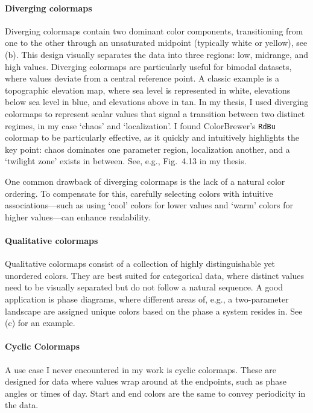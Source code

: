 \paragraph{Diverging colormaps}
Diverging colormaps contain two dominant color components, transitioning from one to the other through an unsaturated midpoint (typically white or yellow), see (b). This design visually separates the data into three regions: low, midrange, and high values. Diverging colormaps are particularly useful for bimodal datasets, where values deviate from a central reference point. A classic example is a topographic elevation map, where sea level is represented in white, elevations below sea level in blue, and elevations above in tan.
In my thesis, I used diverging colormaps to represent scalar values that signal a transition between two distinct regimes, in my case `chaos' and `localization'. I found ColorBrewer’s \texttt{RdBu} colormap to be particularly effective, as it quickly and intuitively highlights the key point: chaos dominates one parameter region, localization another, and a `twilight zone' exists in between. See, e.g., Fig.~4.13 in my thesis.

One common drawback of diverging colormaps is the lack of a natural color ordering. To compensate for this, carefully selecting colors with intuitive associations---such as using `cool' colors for lower values and `warm' colors for higher values---can enhance readability.

\paragraph{Qualitative colormaps}
Qualitative colormaps consist of a collection of highly distinguishable yet unordered colors. They are best suited for categorical data, where distinct values need to be visually separated but do not follow a natural sequence. A good application is phase diagrams, where different areas of, e.g., a two-parameter landscape are assigned unique colors based on the phase a system resides in. See (c) for an example.

\paragraph{Cyclic Colormaps}
A use case I never encountered in my work is cyclic colormaps. These are designed for data where values wrap around at the endpoints, such as phase angles or times of day. Start and end colors are the same to convey periodicity in the data.


